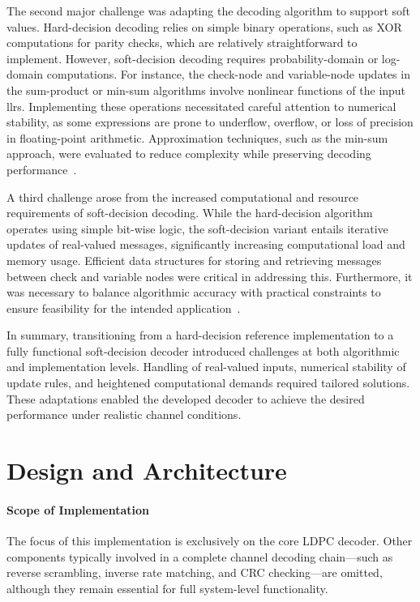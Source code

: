 \documentclass[../main.tex]{subfiles}
\begin{document}
The second major challenge was adapting the decoding algorithm to support soft values. Hard-decision decoding relies on simple binary operations, such as XOR computations for parity checks, which are relatively straightforward to implement. However, soft-decision decoding requires probability-domain or log-domain computations. For instance, the check-node and variable-node updates in the sum-product or min-sum algorithms involve nonlinear functions of the input \glspl{llr}. Implementing these operations necessitated careful attention to numerical stability, as some expressions are prone to underflow, overflow, or loss of precision in floating-point arithmetic. Approximation techniques, such as the min-sum approach, were evaluated to reduce complexity while preserving decoding performance~\cite{Roth2015, Li2025}.

A third challenge arose from the increased computational and resource requirements of soft-decision decoding. While the hard-decision algorithm operates using simple bit-wise logic, the soft-decision variant entails iterative updates of real-valued messages, significantly increasing computational load and memory usage. Efficient data structures for storing and retrieving messages between check and variable nodes were critical in addressing this. Furthermore, it was necessary to balance algorithmic accuracy with practical constraints to ensure feasibility for the intended application~\cite{Larsson-Edefors2014, Dahan2024}.

In summary, transitioning from a hard-decision reference implementation to a fully functional soft-decision decoder introduced challenges at both algorithmic and implementation levels. Handling of real-valued inputs, numerical stability of update rules, and heightened computational demands required tailored solutions. These adaptations enabled the developed decoder to achieve the desired performance under realistic channel conditions.
\section{Design and Architecture}
\label{subsec:design_architecture}


\paragraph{Scope of Implementation}
The focus of this implementation is exclusively on the core LDPC decoder. Other components typically involved in a complete channel decoding chain---such as reverse scrambling, inverse rate matching, and CRC checking---are omitted, although they remain essential for full system-level functionality.
\end{document}
